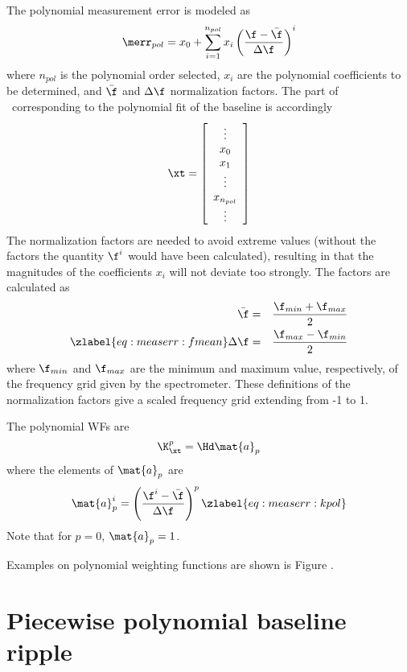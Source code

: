  The polynomial measurement error is modeled as
 \begin{equation}
   \merr_{pol} = x_0 + \sum_{i=1}^{n_{pol}} x_i \left( 
                      \frac{\f-\bar{\f}}{\Delta \f} \right)^i
 \end{equation}
 where $n_{pol}$ is the polynomial order selected, $x_i$ are the 
 polynomial coefficients to be determined, and $\bar{\f}$ and
 $\Delta \f$ normalization factors. The part of \xt\ corresponding
 to the polynomial fit of the baseline is accordingly
 \begin{equation}
   \xt = \left[ \begin{array}{c} \vdots \\ x_0\\ x_1 \\ \vdots \\ x_{n_{pol}} \\ \vdots \end{array} \right]
 \end{equation}
 The normalization factors are needed to avoid extreme values (without
 the factors the quantity $\f^i$ would have been calculated),
 resulting in that the magnitudes of the coefficients $x_i$ will not
 deviate too strongly. The factors are calculated as
 \begin{eqnarray}
   \bar{\f} &=& \frac{\f_{min}+\f_{max}}{2} \\
   \zlabel{eq:measerr:fmean}
   \Delta \f &=& \frac{\f_{max}-\f_{min}}{2}
 \end{eqnarray}
 where $\f_{min}$ and $\f_{max}$ are the minimum and maximum value,
 respectively, of the frequency grid given by the spectrometer. These
 definitions of the normalization factors give a scaled frequency grid
 extending from -1 to 1.

 The polynomial WFs are
 \begin{equation}
   \K_{\xt}^p = \Hd \mat{a}_p
 \end{equation}
 where the elements of $\mat{a}_p$ are
 \begin{equation}
   \mat{a}_p^i = \left( \frac{\f^i-\bar{\f}}{\Delta \f} \right)^p
  \zlabel{eq:measerr:kpol}
 \end{equation}
 Note that for $p=0$, $\mat{a}_p=1$. 
 
 Examples on polynomial weighting functions are shown is Figure 
 .



\section{Piecewise polynomial baseline ripple}
 
